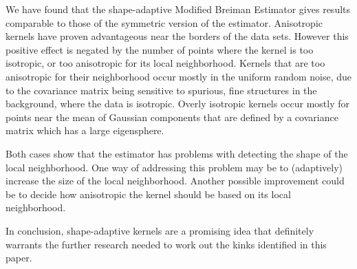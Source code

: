 
We have found that the shape-adaptive Modified Breiman Estimator gives results comparable to those of the symmetric version of the estimator.
Anisotropic kernels have proven advantageous near the borders of the data sets. However this positive effect is negated by the number of points where the kernel is too isotropic, or too anisotropic for its local neighborhood. 
	Kernels that are too anisotropic for their neighborhood occur mostly in the uniform random noise, due to the covariance matrix being sensitive to spurious, fine structures in the background, where the data is isotropic. 
	Overly isotropic kernels occur mostly for points near the mean of Gaussian components that are defined by a covariance matrix which has a large eigensphere. 

Both cases show that the estimator has problems with detecting the shape of the local neighborhood. One way of addressing this problem may be to (adaptively) increase the size of the local neighborhood. Another possible improvement could be to decide how anisotropic the kernel should be based on its local neighborhood.

In conclusion, shape-adaptive kernels are a promising idea that definitely warrants the further research needed to work out the kinks identified in this paper.
